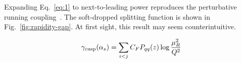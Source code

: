 Expanding Eq.~\eqref{eq:1} to next-to-leading power reproduces the
perturbative running
coupling~\cite{TPC:1513-NLO-Matched-Strong-Coupling-Extraction-with-Foundation-Models-and-Jet-Shapes-October-7-2026}.
The soft-dropped splitting function is shown in
Fig.~\ref{fig:rapidity-gap}. At first sight, this result may seem
counterintuitive.

\begin{equation}
  \gamma_{\rm cusp}(\alpha_s) = \sum_{i<j} C_F P_{qq}(z) \log\frac{\mu_R^2}{Q^2}
  \label{eq:4}
\end{equation}

